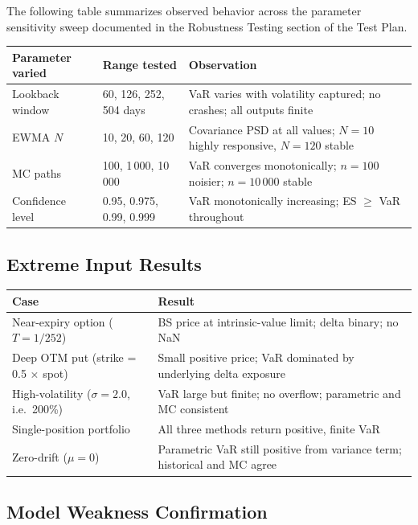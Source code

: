 \documentclass[11pt]{article}
\begin{document}
The following table summarizes observed behavior across the parameter
sensitivity sweep documented in the Robustness Testing section of the
Test Plan.

\begin{center}
\begin{tabular}{L{3.5cm}L{4.5cm}L{5.5cm}}
\toprule
\textbf{Parameter varied} & \textbf{Range tested} & \textbf{Observation} \\
\midrule
Lookback window
  & 60, 126, 252, 504 days
  & VaR varies with volatility captured; no crashes; all outputs finite \\
EWMA $N$
  & 10, 20, 60, 120
  & Covariance PSD at all values; $N = 10$ highly responsive, $N = 120$ stable \\
MC paths
  & 100, 1\,000, 10\,000
  & VaR converges monotonically; $n = 100$ noisier; $n = 10\,000$ stable \\
Confidence level
  & 0.95, 0.975, 0.99, 0.999
  & VaR monotonically increasing; ES $\geq$ VaR throughout \\
\bottomrule
\end{tabular}
\end{center}

\subsection{Extreme Input Results}

\begin{center}
\begin{tabular}{L{5.5cm}L{7.5cm}}
\toprule
\textbf{Case} & \textbf{Result} \\
\midrule
Near-expiry option ($T = 1/252$)
  & BS price at intrinsic-value limit; delta binary; no NaN \\
Deep OTM put (strike = 0.5 $\times$ spot)
  & Small positive price; VaR dominated by underlying delta exposure \\
High-volatility ($\sigma = 2.0$, i.e.\ 200\%)
  & VaR large but finite; no overflow; parametric and MC consistent \\
Single-position portfolio
  & All three methods return positive, finite VaR \\
Zero-drift ($\mu = 0$)
  & Parametric VaR still positive from variance term; historical and MC agree \\
\bottomrule
\end{tabular}
\end{center}

\subsection{Model Weakness Confirmation}
\end{document}
